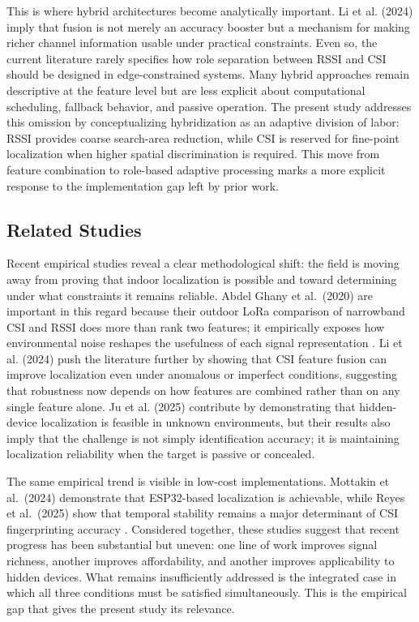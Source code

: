 This is where hybrid architectures become analytically important. Li et al. (2024) imply that fusion is not merely an accuracy booster but a mechanism for making richer channel information usable under practical constraints. Even so, the current literature rarely specifies how role separation between RSSI and CSI should be designed in edge-constrained systems. Many hybrid approaches remain descriptive at the feature level but are less explicit about computational scheduling, fallback behavior, and passive operation. The present study addresses this omission by conceptualizing hybridization as an adaptive division of labor: RSSI provides coarse search-area reduction, while CSI is reserved for fine-point localization when higher spatial discrimination is required. This move from feature combination to role-based adaptive processing marks a more explicit response to the implementation gap left by prior work.

\subsection{Related Studies}
Recent empirical studies reveal a clear methodological shift: the field is moving away from proving that indoor localization is possible and toward determining under what constraints it remains reliable. Abdel Ghany et al.\ (2020) are important in this regard because their outdoor LoRa comparison of narrowband CSI and RSSI does more than rank two features; it empirically exposes how environmental noise reshapes the usefulness of each signal representation \cite{ghany2020robustness}. Li et al. (2024) push the literature further by showing that CSI feature fusion can improve localization even under anomalous or imperfect conditions, suggesting that robustness now depends on how features are combined rather than on any single feature alone. Ju et al. (2025) contribute by demonstrating that hidden-device localization is feasible in unknown environments, but their results also imply that the challenge is not simply identification accuracy; it is maintaining localization reliability when the target is passive or concealed.

The same empirical trend is visible in low-cost implementations. Mottakin et al.\ (2024) demonstrate that ESP32-based localization is achievable, while Reyes et al.\ (2025) show that temporal stability remains a major determinant of CSI fingerprinting accuracy \cite{mottakin2024swiloc,reyes2025temporal}. Considered together, these studies suggest that recent progress has been substantial but uneven: one line of work improves signal richness, another improves affordability, and another improves applicability to hidden devices. What remains insufficiently addressed is the integrated case in which all three conditions must be satisfied simultaneously. This is the empirical gap that gives the present study its relevance.

